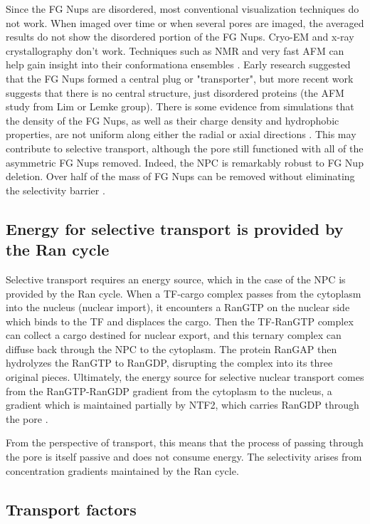 Since the FG Nups are disordered, most conventional visualization techniques do not work.  When imaged over time or when several pores are imaged, the averaged results do not show the disordered portion of the FG Nups.  Cryo-EM and x-ray crystallography don't work.  Techniques such as NMR and very fast AFM can help gain insight into their conformationa ensembles \cite{Loren's papers, the AFM paper}.  Early research suggested that the FG Nups formed a central plug or "transporter", but more recent work suggests that there is no central structure, just disordered proteins (the AFM study from Lim or Lemke group). There is some evidence from simulations that the density of the FG Nups, as well as their charge density and hydrophobic properties, are not uniform along either the radial or axial directions \cite{some energy landscape things, some simulations}.  This may contribute to selective transport, although the pore still functioned with all of the asymmetric FG Nups removed.  Indeed, the NPC is remarkably robust to FG Nup deletion.  Over half of the mass of FG Nups can be removed without eliminating the selectivity barrier \cite{beck17}.

\subsection{Energy for selective transport is provided by the Ran cycle}
Selective transport requires an energy source, which in the case of the NPC is provided by the Ran cycle.  When a TF-cargo complex passes from the cytoplasm into the nucleus (nuclear import), it encounters a RanGTP on the nuclear side which binds to the TF and displaces the cargo.  Then the TF-RanGTP complex can collect a cargo destined for nuclear export, and this ternary complex can diffuse back through the NPC to the cytoplasm.  The protein RanGAP then hydrolyzes the RanGTP to RanGDP, disrupting the complex into its three original pieces.  Ultimately, the energy source for selective nuclear transport comes from the RanGTP-RanGDP gradient from the cytoplasm to the nucleus, a gradient which is maintained partially by NTF2, which carries RanGDP through the pore \cite{stanley17}.

From the perspective of transport, this means that the process of passing through the pore is itself passive and does not consume energy.  The selectivity arises from concentration gradients maintained by the Ran cycle.

\subsection{Transport factors}

